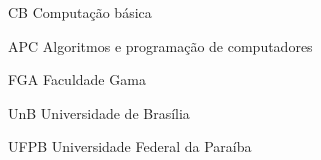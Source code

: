 \begin{siglas}
  \item[CB] Computação básica
  \item[APC] Algoritmos e programação de computadores
  \item[FGA] Faculdade Gama
  \item[UnB] Universidade de Brasília
  \item[UFPB] Universidade Federal da Paraíba 
\end{siglas}
